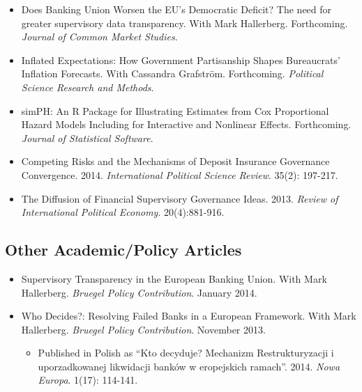 \documentclass[a4paper]{article}
\begin{document}
{{\begin{itemize}

    \item Does Banking Union Worsen the EU's Democratic Deficit? The need for greater supervisory data transparency. With Mark Hallerberg. Forthcoming. {\emph{Journal of Common Market Studies}}.

    \item Inflated Expectations: How Government Partisanship Shapes Bureaucrats' Inflation Forecasts. With Cassandra Grafstr\"{o}m. Forthcoming. {\emph{Political Science Research and Methods}}.

    \item simPH: An R Package for Illustrating Estimates from Cox Proportional Hazard Models Including for Interactive and Nonlinear Effects. Forthcoming. {\emph{Journal of Statistical Software}}.

    \item Competing Risks and the Mechanisms of Deposit Insurance Governance Convergence. 2014. {\emph{International Political Science Review}}. 35(2): 197-217.

    \item The Diffusion of Financial Supervisory Governance Ideas. 2013. {\emph{Review of International Political Economy}}. 20(4):881-916.

\end{itemize}

\subsection*{Other Academic/Policy Articles}

\begin{itemize}

    \item Supervisory Transparency in the European Banking Union. With Mark Hallerberg. {\emph{Bruegel Policy Contribution}}. January 2014.

    \item Who Decides?: Resolving Failed Banks in a European Framework. With Mark Hallerberg. {\emph{Bruegel Policy Contribution}}. November 2013.

      \begin{itemize}
        \item Published in Polish as ``Kto decyduje? Mechanizm Restrukturyzacji i uporzadkowanej likwidacji bank\'{o}w w eropejskich ramach''. 2014. \emph{Nowa Europa}. 1(17): 114-141.
      \end{itemize}


\end{itemize}}}
\end{document}
